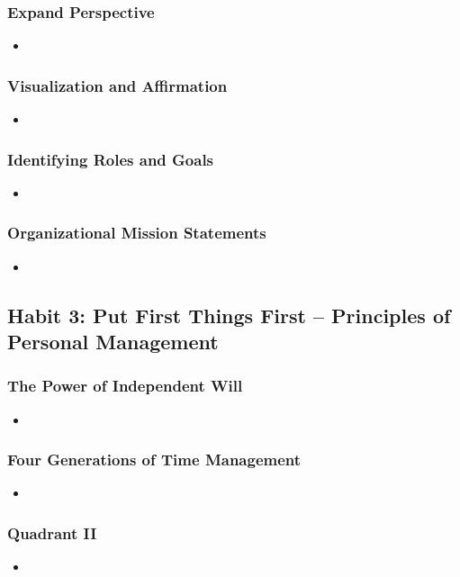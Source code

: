 \documentclass[11pt]{article}
\begin{document}
\subsubsection{Expand Perspective}
\begin{itemize}
\item 
\end{itemize}
\subsubsection{Visualization and Affirmation}
\begin{itemize}
\item 
\end{itemize}
\subsubsection{Identifying Roles and Goals}
\begin{itemize}
\item 
\end{itemize}
\subsubsection{Organizational Mission Statements}
\begin{itemize}
\item 
\end{itemize}
\subsection{Habit 3: Put First Things First -- Principles of Personal Management}
\subsubsection{The Power of Independent Will}
\begin{itemize}
\item 
\end{itemize}
\subsubsection{Four Generations of Time Management}
\begin{itemize}
\item 
\end{itemize}
\subsubsection{Quadrant II}
\begin{itemize}
\item 
\end{itemize}
\end{document}
